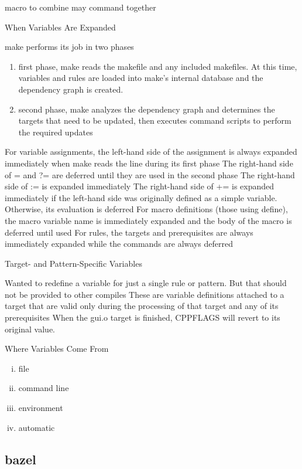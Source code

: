 macro to combine may command together


When Variables Are Expanded

make performs its job in two phases

\begin{enumerate}
  \item first phase, make reads the makefile and any included makefiles. At this time, variables and rules are loaded into make's internal database and the dependency graph is created.
  \item second phase, make analyzes the dependency graph and determines the targets that need to be updated, then executes command scripts to perform the required updates
\end{enumerate}
For variable assignments, the left-hand side of the assignment is always expanded immediately when make reads the line during its first phase
The right-hand side of = and ?= are deferred until they are used in the second phase
The right-hand side of := is expanded immediately
The right-hand side of += is expanded immediately if the left-hand side was originally defined as a simple variable. Otherwise, its evaluation is deferred
For macro definitions (those using define), the macro variable name is immediately expanded and the body of the macro is deferred until used
For rules, the targets and prerequisites are always immediately expanded while the commands are always deferred


Target- and Pattern-Specific Variables

Wanted to redefine a variable for just a single rule or pattern. But that should not be provided to other compiles
These are variable definitions attached to a target that are valid only during the processing of that target and any of its prerequisites
When the gui.o target is finished, CPPFLAGS will revert to its original value.

Where Variables Come From
\begin{enumerate}[(i)]
  \item file
  \item command line
  \item environment
  \item automatic
\end{enumerate}

\subsection{bazel}
